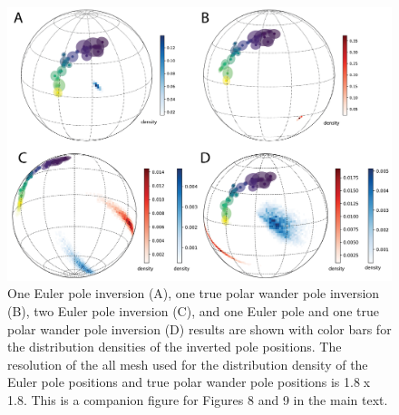 \documentclass[11pt,letterpaper]{article}
\begin{document}
\begin{figure}[h!]
\noindent\includegraphics[width=\textwidth]{SI_Kewee.png}
\caption{One Euler pole inversion (A), one true polar wander pole inversion (B), two Euler pole inversion (C), and one Euler pole and one true polar wander pole inversion (D) results are shown with color bars for the distribution densities of the inverted pole positions. The resolution of the all mesh used for the distribution density of the Euler pole positions and true polar wander pole positions is 1.8\textdegree$\;$x 1.8\textdegree. This is a companion figure for Figures 8 and 9 in the main text. }
\label{pdffiguresample}
\end{figure}
\end{document}

